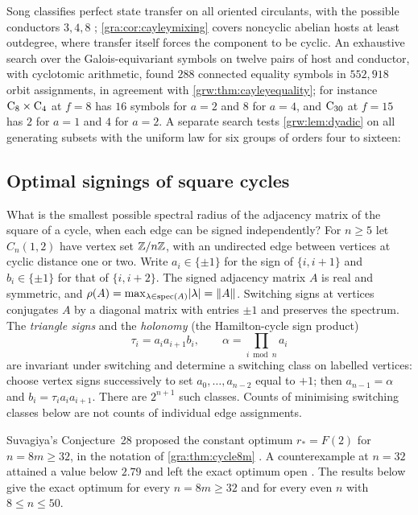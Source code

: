 Song classifies perfect state transfer on all oriented circulants, with the
possible conductors $3,4,8$ \cite{Song2026Perfect}; \cref{gra:cor:cayleymixing}
covers noncyclic abelian hosts at least outdegree, where transfer itself
forces the component to be cyclic. An exhaustive search over the
Galois-equivariant symbols on twelve pairs of host and conductor, with
cyclotomic arithmetic, found $288$ connected equality symbols in
$552{,}918$ orbit assignments, in agreement with
\cref{grw:thm:cayleyequality}; for instance $\mathrm{C}_8\times\mathrm{C}_4$ at
$f=8$ has $16$ symbols for $a=2$ and $8$ for $a=4$, and $\mathrm{C}_{30}$ at
$f=15$ has $2$ for $a=1$ and $4$ for $a=2$. A separate search tests
\cref{grw:lem:dyadic} on all generating subsets with the uniform law for
six groups of orders four to sixteen:

\subsection{Optimal signings of square cycles}\label{gra:sec:cycles}

What is the smallest possible spectral radius of the adjacency matrix of
the square of a cycle, when each edge can be signed independently? For
$n\ge5$ let $C_n(1,2)$ have vertex set $\mathbb{Z}/n\mathbb{Z}$, with an undirected edge
between vertices at cyclic distance one or two. Write $a_i\in\{\pm1\}$ for
the sign of $\{i,i+1\}$ and $b_i\in\{\pm1\}$ for that of $\{i,i+2\}$. The
signed adjacency matrix $A$ is real and symmetric, and
$\rho(A)=\max_{\lambda\in\operatorname{spec}(A)}\lvert\lambda\rvert=\lVert A\rVert$. Switching
signs at vertices conjugates $A$ by a diagonal matrix with entries $\pm1$
and preserves the spectrum. The \emph{triangle signs} and the
\emph{holonomy} (the Hamilton-cycle sign product)
\[
 \tau_i=a_ia_{i+1}b_i,\qquad\alpha=\prod_{i\bmod n}a_i
\]
are invariant under switching and determine a switching class on labelled
vertices: choose vertex signs successively to set $a_0,\dots,a_{n-2}$
equal to $+1$; then $a_{n-1}=\alpha$ and $b_i=\tau_ia_ia_{i+1}$. There are
$2^{n+1}$ such classes. Counts of minimising switching classes below are
not counts of individual edge assignments.

Suvagiya's Conjecture~28 proposed the constant optimum
$r_*=F(2)$ for $n=8m\ge32$, in the notation of \cref{gra:thm:cycle8m}
\cite{Suvagiya2026Parity}. A counterexample at $n=32$ attained a value
below $2.79$ and left the exact optimum open
\cite{Trureturing2026Refutation}. The results below give the exact
optimum for every $n=8m\ge32$ and for every even $n$ with $8\le n\le50$.

